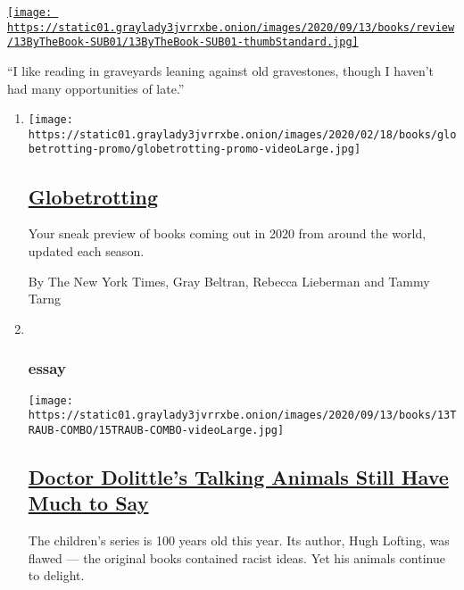 \begin{enumerate}
\begin{enumerate}
    \href{/2020/09/10/books/review/jane-fonda-by-the-book-interview.html}{\texttt{[image: https://static01.graylady3jvrrxbe.onion/images/2020/09/13/books/review/13ByTheBook-SUB01/13ByTheBook-SUB01-thumbStandard.jpg]}}

    ``I like reading in graveyards leaning against old gravestones,
    though I haven't had many opportunities of late.''
  \end{enumerate}
\end{enumerate}

\begin{enumerate}
\def\labelenumi{\arabic{enumi}.}
\item
  \texttt{[image: https://static01.graylady3jvrrxbe.onion/images/2020/02/18/books/globetrotting-promo/globetrotting-promo-videoLarge.jpg]}

  \hypertarget{globetrotting}{%
  \subsection{\texorpdfstring{\href{/interactive/2020/01/08/books/new-books-international.html}{Globetrotting}}{Globetrotting}}\label{globetrotting}}

  Your sneak preview of books coming out in 2020 from around the world,
  updated each season.

  By The New York Times, Gray Beltran, Rebecca Lieberman and Tammy Tarng
\item ~
  \hypertarget{essay}{%
  \subsubsection{essay}\label{essay}}

  \texttt{[image: https://static01.graylady3jvrrxbe.onion/images/2020/09/13/books/13TRAUB-COMBO/15TRAUB-COMBO-videoLarge.jpg]}

  \hypertarget{doctor-dolittles-talking-animals-still-have-much-to-say}{%
  \subsection{\texorpdfstring{\href{/2020/09/09/books/review/doctor-dolittle-hugh-lofting-talking-animals.html}{Doctor
  Dolittle's Talking Animals Still Have Much to
  Say}}{Doctor Dolittle's Talking Animals Still Have Much to Say}}\label{doctor-dolittles-talking-animals-still-have-much-to-say}}

  The children's series is 100 years old this year. Its author, Hugh
  Lofting, was flawed --- the original books contained racist ideas. Yet
  his animals continue to delight.


\end{enumerate}
